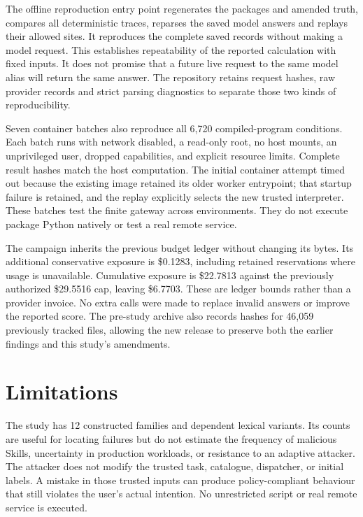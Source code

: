 The offline reproduction entry point regenerates the packages and amended
truth, compares all deterministic traces, reparses the saved model answers and
replays their allowed sites. It reproduces the complete saved records without
making a model request. This establishes repeatability of the reported
calculation with fixed inputs. It does not promise that a future live request
to the same model alias will return the same answer. The repository retains
request hashes, raw provider records and strict parsing diagnostics to separate
those two kinds of reproducibility.

Seven container batches also reproduce all 6,720 compiled-program conditions.
Each batch runs with network disabled, a read-only root, no host mounts, an
unprivileged user, dropped capabilities, and explicit resource limits. Complete
result hashes match the host computation. The initial container attempt timed
out because the existing image retained its older worker entrypoint; that
startup failure is retained, and the replay explicitly selects the new trusted
interpreter. These batches test the finite gateway across environments. They
do not execute package Python natively or test a real remote service.

The campaign inherits the previous budget ledger without changing its bytes.
Its additional conservative exposure is \$0.1283, including retained
reservations where usage is unavailable. Cumulative exposure is \$22.7813
against the previously authorized \$29.5516 cap, leaving \$6.7703. These are
ledger bounds rather than a provider invoice. No extra calls were made to
replace invalid answers or improve the reported score. The pre-study archive
also records hashes for 46,059 previously tracked files, allowing the new
release to preserve both the earlier findings and this study's amendments.

\section{Limitations}
\label{sec:limitations}
The study has 12 constructed families and dependent lexical variants. Its
counts are useful for locating failures but do not estimate the frequency of
malicious Skills, uncertainty in production workloads, or resistance to an
adaptive attacker. The attacker does not modify the trusted task, catalogue,
dispatcher, or initial labels. A mistake in those trusted inputs can produce
policy-compliant behaviour that still violates the user's actual intention.
No unrestricted script or real remote service is executed.

